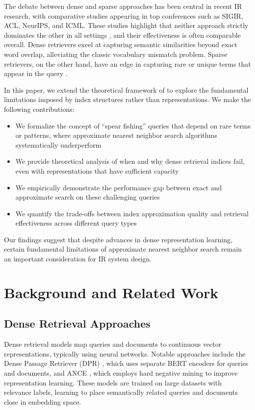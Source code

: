 \documentclass[sigconf,review]{acmart}
\begin{document}
The debate between dense and sparse approaches has been central in recent IR research, with comparative studies appearing in top conferences such as SIGIR, ACL, NeurIPS, and ICML. These studies highlight that neither approach strictly dominates the other in all settings \cite{lin2024dense}, and their effectiveness is often comparable overall. Dense retrievers excel at capturing semantic similarities beyond exact word overlap, alleviating the classic vocabulary mismatch problem. Sparse retrievers, on the other hand, have an edge in capturing rare or unique terms that appear in the query \cite{sciavolino2021entityquestions, chen2022salient}.

In this paper, we extend the theoretical framework of \citet{tay2020sparse} to explore the fundamental limitations imposed by index structures rather than representations. We make the following contributions:

\begin{itemize}
\item We formalize the concept of ``spear fishing'' queries that depend on rare terms or patterns, where approximate nearest neighbor search algorithms systematically underperform
\item We provide theoretical analysis of when and why dense retrieval indices fail, even with representations that have sufficient capacity
\item We empirically demonstrate the performance gap between exact and approximate search on these challenging queries
\item We quantify the trade-offs between index approximation quality and retrieval effectiveness across different query types
\end{itemize}

Our findings suggest that despite advances in dense representation learning, certain fundamental limitations of approximate nearest neighbor search remain an important consideration for IR system design.

\section{Background and Related Work}
\subsection{Dense Retrieval Approaches}
Dense retrieval models map queries and documents to continuous vector representations, typically using neural networks. Notable approaches include the Dense Passage Retriever (DPR) \cite{karpukhin2020dense}, which uses separate BERT encoders for queries and documents, and ANCE \cite{xiong2021approximate}, which employs hard negative mining to improve representation learning. These models are trained on large datasets with relevance labels, learning to place semantically related queries and documents close in embedding space.
\end{document}
